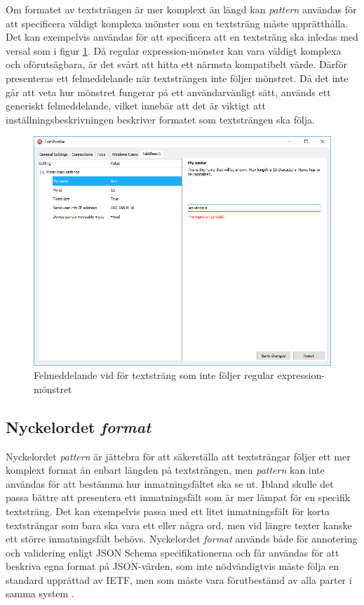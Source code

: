 Om formatet av textsträngen är mer komplext än längd kan \textit{pattern} användas för att specificera väldigt komplexa mönster som en textsträng måste upprätthålla. Det kan exempelvis användas för att specificera att en textsträng ska inledas med versal som i figur \ref{fig:textstrang-pattern}. Då regular expression-mönster kan vara väldigt komplexa och oförutsägbara, är det svårt att hitta ett närmsta kompatibelt värde. Därför presenteras ett felmeddelande när textsträngen inte följer mönstret. Då det inte går att veta hur mönstret fungerar på ett användarvänligt sätt, används ett generiskt felmeddelande, vilket innebär att det är viktigt att inställningsbeskrivningen beskriver formatet som textsträngen ska följa.

\begin{figure}
	\includegraphics[width=\textwidth]{./images/gui/textstrang-pattern.png}
	\vspace{-1.7em}
	\caption{Felmeddelande vid för textsträng som inte följer regular expression-mönstret}
	\label{fig:textstrang-pattern}
\end{figure}

\FloatBarrier
\subsection{Nyckelordet \textit{format}}

Nyckelordet \textit{pattern} är jättebra för att säkerställa att textsträngar följer ett mer komplext format än enbart längden på textsträngen, men \textit{pattern} kan inte användas för att bestämma hur inmatningsfältet ska se ut. Ibland skulle det passa bättre att presentera ett inmatningsfält som är mer lämpat för en specifik textsträng. Det kan exempelvis passa med ett litet inmatningsfält för korta textsträngar som bara ska vara ett eller några ord, men vid längre texter kanske ett större inmatningsfält behövs. Nyckelordet \textit{format} används både för annotering och validering enligt JSON Schema specifikationerna och får användas för att beskriva egna format på JSON-värden, som inte nödvändigtvis måste följa en standard upprättad av IETF, men som måste vara förutbestämd av alla parter i samma system \cite{Andrews2018}.


